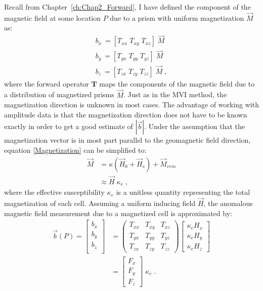 Recall from Chapter~\ref{ch:Chap2_Forward}, I have defined the component of the magnetic field at some location $P$  due to a prism with uniform magnetization $\vec{M}$ as: 
\begin{gather*}
	b_x \: = {[T_{xx} \; T_{xy} \; T_{xz}] }\;  \vec {{M}} \\
	b_y \: ={[T_{yx} \; T_{yy} \; T_{yz}] }\;  \vec {{M}} \\
	b_z \: = {[T_{zx} \; T_{zy} \; T_{zz}]  }\; \vec {{M}} \;,
\end{gather*}
where the forward operator $\mathbf{T}$ maps the components of the magnetic field due to a distribution of magnetized prisms $\vec {{M}}$.
Just as in the MVI method, the magnetization direction is unknown in most cases.
The advantage of working with amplitude data is that the magnetization direction does not have to be known exactly in order to get a good estimate of ${|\vec b|}$. 
Under the assumption that the magnetization vector is in most part parallel to the geomagnetic field direction, equation \ref{Magnetization} can be simplified to:
 \begin{equation*}
\begin{split}
	\vec M &= \kappa(\vec H_0 + \vec H_s) + \vec M_{rem} \\
	&\approx \vec H \; \kappa_{e}\;,
\end{split}
\end{equation*}
where the effective susceptibility $\kappa_{e}$ is a unitless quantity representing the total magnetization of each cell.
Assuming a uniform inducing field $\vec H$, the anomalous magnetic field measurement due to a magnetized cell is approximated by:
 \begin{equation}\label{M_eff}
\begin{split}
\vec b(P) = 
\begin{bmatrix}
b_x\\
b_y\\
b_z\\
\end{bmatrix} &=
 \begin{pmatrix}
       		T_{xx} & T_{xy} & T_{xz}    \\
		T_{yx} & T_{yy} & T_{yz}    \\
		T_{zx} & T_{zy} & T_{zz}           
	\end{pmatrix} 
\begin{bmatrix}
\kappa_e H_{x}\\
\kappa_e H_{y}\\
\kappa_e H_{z}
\end{bmatrix} \\
&=
\begin{bmatrix}
F_x \\
F_y\\
F_z 
\end{bmatrix} \;\kappa_e\;.
\end{split}
\end{equation}
